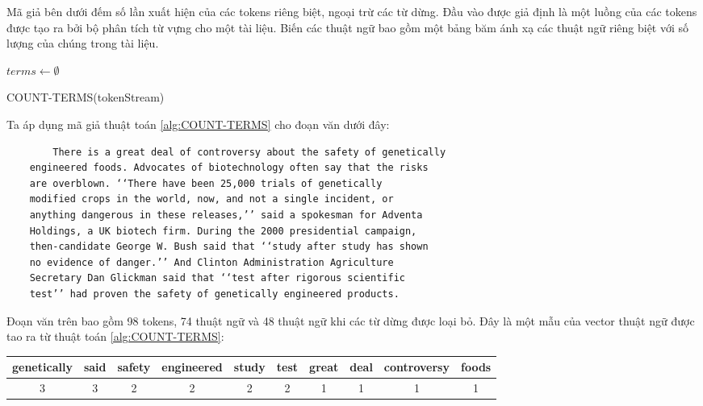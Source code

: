 \documentclass[14pt, a4paper]{article}
\numberwithin{equation}{section}
\numberwithin{figure}{section}
\numberwithin{dl}{section}
\numberwithin{md}{section}
\numberwithin{bd}{section}
\numberwithin{dn}{section}
\numberwithin{hq}{section}
\begin{document}
    Mã giả bên dưới đếm số lần xuất hiện của các tokens riêng biệt, ngoại trừ các từ dừng.
    Đầu vào được giả định là một luồng của các tokens được tạo ra bởi bộ phân tích từ vựng cho một tài liệu.
    Biến các thuật ngữ bao gồm một bảng băm ánh xạ các thuật ngữ riêng biệt với số lượng của chúng trong tài liệu.

    \begin{algorithm}[h!]
        \DontPrintSemicolon
        $terms \gets \emptyset$\;
        \;
        \caption{COUNT-TERMS(tokenStream)}
        \label{alg:COUNT-TERMS}
    \end{algorithm}

    Ta áp dụng mã giả thuật toán \ref{alg:COUNT-TERMS} cho đoạn văn dưới đây:
    
    \begin{verbatim}
        There is a great deal of controversy about the safety of genetically
    engineered foods. Advocates of biotechnology often say that the risks
    are overblown. ‘‘There have been 25,000 trials of genetically
    modified crops in the world, now, and not a single incident, or
    anything dangerous in these releases,’’ said a spokesman for Adventa
    Holdings, a UK biotech firm. During the 2000 presidential campaign,
    then-candidate George W. Bush said that ‘‘study after study has shown
    no evidence of danger.’’ And Clinton Administration Agriculture
    Secretary Dan Glickman said that ‘‘test after rigorous scientific
    test’’ had proven the safety of genetically engineered products.
    \end{verbatim}

    Đoạn văn trên bao gồm 98 tokens, 74 thuật ngữ và 48 thuật ngữ khi các từ dừng được loại bỏ.
    Đây là một mẫu của vector thuật ngữ được tao ra từ thuật toán \ref{alg:COUNT-TERMS}:

    \begin{table}[h!]
        \begin{tabular} {|c| c| c| c| c| c| c| c| c| c|}
            \hline
            genetically & said & safety & engineered & study & test & great & deal & controversy & foods \\
            \hline
            3 & 3 & 2 & 2 & 2 & 2 & 1 & 1 & 1 & 1 \\
            \hline
        \end{tabular}
    \end{table}
\end{document}
